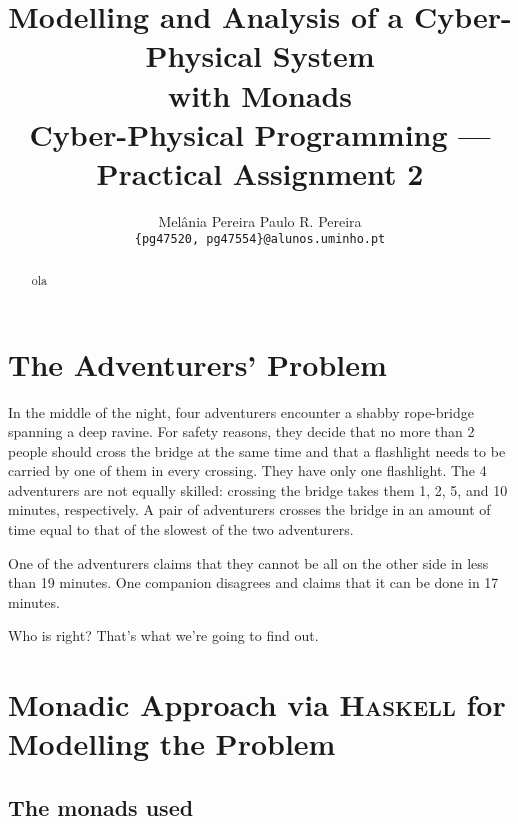 \documentclass[a4paper]{article}
\title{\bfseries Modelling and Analysis of a Cyber-Physical System\\ with Monads \\ {\Large Cyber-Physical Programming --- Practical Assignment 2}}
\author{
    Melânia Pereira \quad \quad Paulo R. Pereira\\
    \texttt{\{pg47520, pg47554\}@alunos.uminho.pt}
}
\begin{document}
\raggedbottom
{}

\maketitle

\begin{abstract}
ola
\end{abstract}


\section{The Adventurers' Problem}
In the middle of the night, four adventurers encounter a shabby rope-bridge spanning a deep ravine.
For safety reasons, they decide that no more than 2 people should cross the bridge at the same
time and that a flashlight needs to be carried by one of them in every crossing. They have only
one flashlight. The 4 adventurers are not equally skilled: crossing the bridge takes them 1, 2, 5,
and 10 minutes, respectively. A pair of adventurers crosses the bridge in an amount of time equal
to that of the slowest of the two adventurers.

One of the adventurers claims that they cannot be all on the other side in less than 19 minutes.
One companion disagrees and claims that it can be done in 17 minutes.

Who is right? That's what we're going to find out.

\section{Monadic Approach via \textsc{Haskell} for Modelling the Problem}
\subsection{The monads used}
\end{document}
